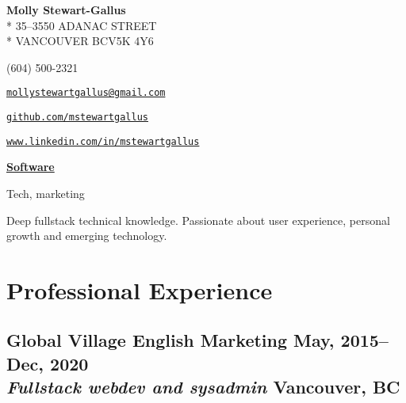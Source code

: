 \documentclass[oneside]{scrartcl}
\makeatletter
\newcommand{\experience}[4]{
  \subsection[#1]{#1 \hfill \small #4 \\
  \textmd{\textit{#2} \hfill #3}}}
\newcommand{\email}{mollystewartgallus@gmail.com}
\newcommand{\github}{github.com/mstewartgallus}
\newcommand{\linkedin}{www.linkedin.com/in/mstewartgallus}
\makeatother
\begin{document}
{


{\Large \textbf{Molly Stewart-Gallus}}\\*
35--3550 ADANAC STREET\\*
VANCOUVER BC\hspace{0.5em}V5K 4Y6
\begin{description}[nosep]
\item[Phone] (604) 500-2321
\item[Email] \href{mailto://\email}{\nolinkurl{\email}}
\item[GitHub] \href{https://\github}{\nolinkurl{\github}}
\item[LinkedIn] \href{https://\linkedin}{\nolinkurl{\linkedin}}
\end{description}
}

\bigskip

\underline{\textbf{\LARGE{}Software}}

\bigskip

Tech, marketing

Deep fullstack technical
knowledge. Passionate about user experience, personal growth and
emerging technology.

\section{Professional Experience}
\experience{Global Village English Marketing}
{Fullstack webdev and sysadmin}{Vancouver, BC}{May, 2015--Dec, 2020}
\end{document}
